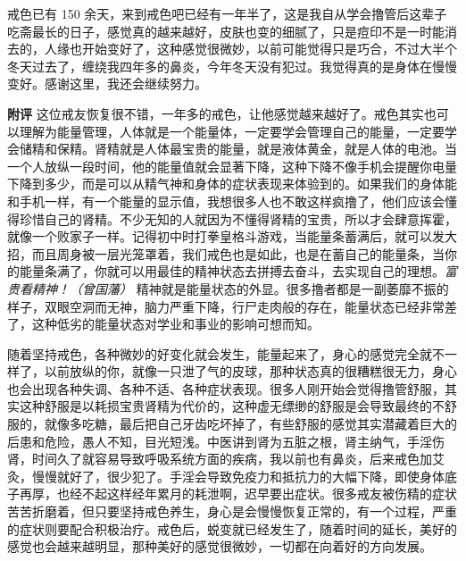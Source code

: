 \begin{case}
    戒色已有 150 余天，来到戒色吧已经有一年半了，这是我自从学会撸管后这辈子吃斋最长的日子，感觉真的越来越好，皮肤也变的细腻了，只是痘印不是一时能消去的，人缘也开始变好了，这种感觉很微妙，以前可能觉得只是巧合，不过大半个冬天过去了，缠绕我四年多的鼻炎，今年冬天没有犯过。我觉得真的是身体在慢慢变好。感谢这里，我还会继续努力。

    \textbf{附评} 这位戒友恢复很不错，一年多的戒色，让他感觉越来越好了。戒色其实也可以理解为能量管理，人体就是一个能量体，一定要学会管理自己的能量，一定要学会储精和保精。肾精就是人体最宝贵的能量，就是液体黄金，就是人体的电池。当一个人放纵一段时间，他的能量值就会显著下降，这种下降不像手机会提醒你电量下降到多少，而是可以从精气神和身体的症状表现来体验到的。如果我们的身体能和手机一样，有一个能量的显示值，我想很多人也不敢这样疯撸了，他们应该会懂得珍惜自己的肾精。不少无知的人就因为不懂得肾精的宝贵，所以才会肆意挥霍，就像一个败家子一样。记得初中时打拳皇格斗游戏，当能量条蓄满后，就可以发大招，而且周身被一层光笼罩着，我们戒色也是如此，也是在蓄自己的能量条，当你的能量条满了，你就可以用最佳的精神状态去拼搏去奋斗，去实现自己的理想。\textit{富贵看精神！（曾国藩）} 精神就是能量状态的外显。很多撸者都是一副萎靡不振的样子，双眼空洞而无神，脑力严重下降，行尸走肉般的存在，能量状态已经非常差了，这种低劣的能量状态对学业和事业的影响可想而知。

    随着坚持戒色，各种微妙的好变化就会发生，能量起来了，身心的感觉完全就不一样了，以前放纵的你，就像一只泄了气的皮球，那种状态真的很糟糕很无力，身心也会出现各种失调、各种不适、各种症状表现。很多人刚开始会觉得撸管舒服，其实这种舒服是以耗损宝贵肾精为代价的，这种虚无缥缈的舒服是会导致最终的不舒服的，就像多吃糖，最后把自己牙齿吃坏掉了，有些舒服的感觉其实潜藏着巨大的后患和危险，愚人不知，目光短浅。中医讲到肾为五脏之根，肾主纳气，手淫伤肾，时间久了就容易导致呼吸系统方面的疾病，我以前也有鼻炎，后来戒色加艾灸，慢慢就好了，很少犯了。手淫会导致免疫力和抵抗力的大幅下降，即使身体底子再厚，也经不起这样经年累月的耗泄啊，迟早要出症状。很多戒友被伤精的症状苦苦折磨着，但只要坚持戒色养生，身心是会慢慢恢复正常的，有一个过程，严重的症状则要配合积极治疗。戒色后，蜕变就已经发生了，随着时间的延长，美好的感觉也会越来越明显，那种美好的感觉很微妙，一切都在向着好的方向发展。
\end{case}

